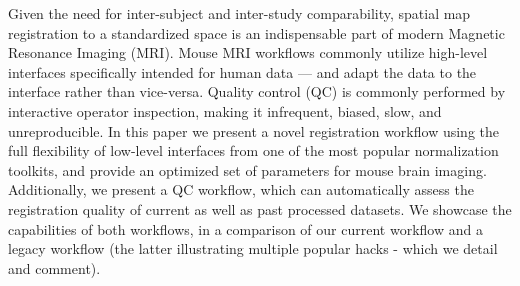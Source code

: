 Given the need for inter-subject and inter-study comparability, spatial map registration to a standardized space is an indispensable part of modern Magnetic Resonance Imaging (MRI).
Mouse MRI workflows commonly utilize high-level interfaces specifically intended for human data --- and adapt the data to the interface rather than vice-versa.
Quality control (QC) is commonly performed by interactive operator inspection, making it infrequent, biased, slow, and unreproducible.
In this paper we present a novel registration workflow using the full flexibility of low-level interfaces from one of the most popular normalization toolkits, and provide an optimized set of parameters for mouse brain imaging.
Additionally, we present a QC workflow, which can automatically assess the registration quality of current as well as past processed datasets.
We showcase the capabilities of both workflows, in a comparison of our current workflow and a legacy workflow (the latter illustrating multiple popular hacks - which we detail and comment).

